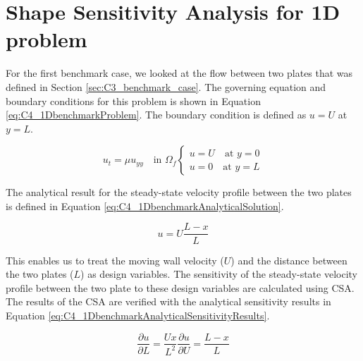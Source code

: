 \section{Shape Sensitivity Analysis for 1D problem}
For the first benchmark case, we looked at the flow between two plates that was defined in Section \ref{sec:C3_benchmark_case}. The governing equation and boundary conditions for this problem is shown in Equation \eqref{eq:C4_1DbenchmarkProblem}. The boundary condition is defined as $u = U$ at $y = L$.

\begin{subequations}\label{eq:C4_1DbenchmarkProblem}
\begin{equation}\label{eq:C4_1DbenchmarkGoverningEquation}
    u_t = \mu u_{yy} \quad \text{in } \Omega_f
\end{equation}
\begin{equation}\label{eq:C4_1DbenchmarkBoundaryCondition}
\begin{cases}
    u = U \quad \text{at } y = 0 \\
    u = 0 \quad \text{at } y = L
\end{cases}
\end{equation}
\end{subequations}

The analytical result for the steady-state velocity profile between the two plates is defined in Equation \eqref{eq:C4_1DbenchmarkAnalyticalSolution}.

\begin{equation}\label{eq:C4_1DbenchmarkAnalyticalSolution}
    u = U\frac{L - x}{L}
\end{equation}

This enables us to treat the moving wall velocity ($U$) and the distance between the two plates ($L$) as design variables. The sensitivity of the steady-state velocity profile between the two plate to these design variables are calculated using CSA. The results of the CSA are verified with the analytical sensitivity results in Equation \eqref{eq:C4_1DbenchmarkAnalyticalSensitivityResults}.

\begin{subequations}\label{eq:C4_1DbenchmarkAnalyticalSensitivityResults}
\begin{equation}\label{eq:C4_1DbenchmarkAnalyticalSAlength}
    \frac{\partial u}{\partial L} = \frac{Ux}{L^2}
\end{equation}
\begin{equation}\label{eq:C4_1DbenchmarkAnalyticalSAvelocity}
    \frac{\partial u}{\partial U} = \frac{L - x}{L}
\end{equation}
\end{subequations}

